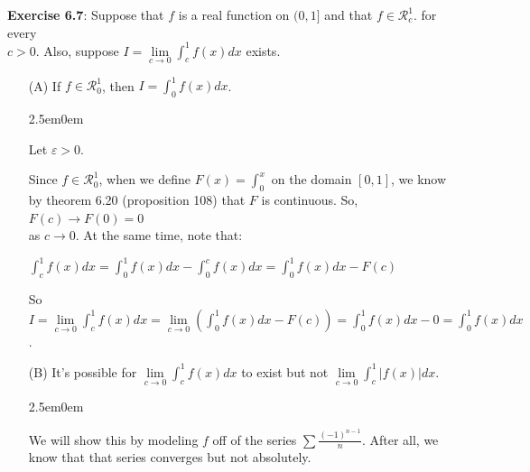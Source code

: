 \documentclass{book}
\newcommand{\pracTwo}{
   \color{Orange}%
   \fontsize{12}{14}\selectfont%
}
\newenvironment{myIndent}{%
   \begin{adjustwidth}{2.5em}{0em}%
}{%
   \end{adjustwidth}%
}
\newcommand{\retTwo}{\hfill\bigbreak}
\begin{document}
\textbf{Exercise 6.7}: Suppose that $f$ is a real function on $(0, 1]$ and that $f \in \mathscr{R}_c^1$. for every\\ $c > 0$. Also, suppose $I = \lim\limits_{c\rightarrow 0}\int_c^1 f(x)dx$ exists.
\begin{itemize}
   \item[(A)] If $f \in \mathscr{R}_0^1$, then $I = \int_0^1f(x)dx$.
   
   {\begin{myIndent}\pracTwo
      Let $\varepsilon > 0$.\retTwo

      Since $f \in \mathscr{R}_0^1$, when we define $F(x) = \int_0^x$ on the domain $[0, 1]$, we know\\ by theorem 6.20 (proposition 108) that $F$ is continuous. So, $F(c) \rightarrow F(0) = 0$\\ as $c \rightarrow 0$. At the same time, note that:

      {\centering $\int_c^1f(x)dx = \int_0^1f(x)dx - \int_0^cf(x)dx = \int_0^1f(x)dx - F(c)$ \retTwo\par}

      So $I = \lim\limits_{c\rightarrow 0}\int_c^1 f(x)dx = \lim\limits_{c\rightarrow 0}\left(\int_0^1 f(x)dx - F(c)\right) = \int_0^1 f(x)dx - 0 = \int_0^1 f(x)dx$.\retTwo
   \end{myIndent}}

   \item[(B)] It's possible for $\lim\limits_{c\rightarrow 0}\int_c^1 f(x)dx$ to exist but not $\lim\limits_{c\rightarrow 0}\int_c^1 |f(x)|dx$.
   
   {\begin{myIndent}\pracTwo
      We will show this by modeling $f$ off of the series $\sum\frac{(-1)^{n-1}}{n}$. After all, we\\ know that that series converges but not absolutely.\retTwo
   \end{myIndent}}

\end{itemize}
\end{document}
